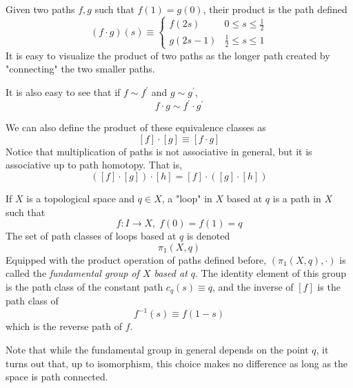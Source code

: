   \begin{definition}
  Given two paths $f, g$ such that $f(1) = g(0)$, their product is the path defined
  \[(f \cdot g) (s) \equiv \begin{cases}
        f(2s) & 0 \leq s \leq \frac{1}{2} \\
        g(2s - 1) & \frac{1}{2} \leq s \leq 1
  \end{cases}\]
  It is easy to visualize the product of two paths as the longer path created by "connecting" the two smaller paths. 
  \begin{center}
  \end{center}
  It is also easy to see that if $f \sim f^\prime$ and $g \sim g^\prime$, 
  \[f \cdot g \sim f^\prime \cdot g^\prime\]
  \end{definition}

  We can also define the product of these equivalence classes as
  \[[f] \cdot [g] \equiv [f \cdot g]\]
  Notice that multiplication of paths is not associative in general, but it is associative up to path homotopy. That is, 
  \[([f] \cdot [g]) \cdot [h] = [f] \cdot ([g] \cdot [h])\]

  \begin{definition}
  If $X$ is a topological space and $q \in X$, a "loop" in $X$ based at $q$ is a path in $X$ such that
  \[f: I\longrightarrow X, \; f(0) = f(1) = q\]
  The set of path classes of loops based at $q$ is denoted
  \[\pi_1 (X, q)\]
  Equipped with the product operation of paths defined before, $(\pi_1 (X, q), \cdot)$ is called the \textit{fundamental group of $X$ based at $q$}. The identity element of this group is the path class of the constant path $c_q(s) \equiv q$, and the inverse of $[f]$ is the path class of 
  \[f^{-1} (s) \equiv f(1-s)\]
  which is the reverse path of $f$. 
  \end{definition}

  Note that while the fundamental group in general depends on the point $q$, it turns out that, up to isomorphism, this choice makes no difference as long as the space is path connected. 

